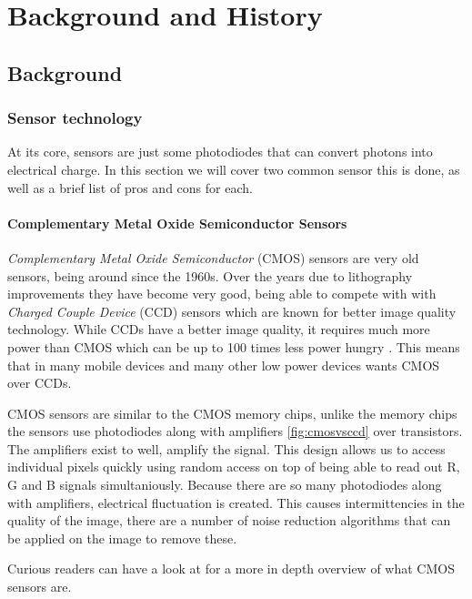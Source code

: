 \chapter{Background and History\label{section:history}}
\section{Background}\label{section:background}

\subsection{Sensor technology}
At its core, sensors are just some photodiodes that can convert photons
into electrical charge. In this section we will cover two common sensor this is
done, as well as a brief list of pros and cons for each.

\subsubsection{Complementary Metal Oxide Semiconductor Sensors}
\textit{Complementary Metal Oxide Semiconductor} (CMOS) sensors are very old
sensors, being around since the 1960s. Over the years due to lithography
improvements they have become very good, being able to compete with with
\textit{Charged Couple Device} (CCD) sensors which are known for better image
quality technology. While CCDs have a better image quality, it requires much
more power than CMOS which can be up to 100 times less power hungry
\cite{CMOSReview}. This means that in many mobile devices and many other low
power devices wants CMOS over CCDs.

CMOS sensors are similar to the CMOS memory chips, unlike the memory chips the
sensors use photodiodes along with amplifiers \cref{fig:cmosvsccd} over
transistors. The amplifiers exist to well, amplify the signal. This design
allows us to access individual pixels quickly using random access on top of being
able to read out R, G and B signals simultaniously\cite{cmosAlen}. Because
there are so many photodiodes along with amplifiers, electrical fluctuation
is created. This causes intermittencies in the quality of the image, there are
a number of noise reduction algorithms that can be applied on the image to
remove these.

Curious readers can have a look at \cite{CMOSReview} \cite{ieeeCMOS} for a more
in depth overview of what CMOS sensors are.

